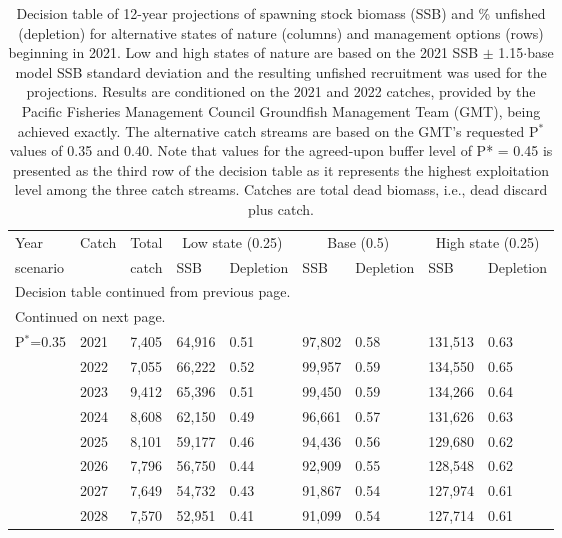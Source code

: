 \documentclass[11pt,
  english,
  a4paper,
]{article}
\begin{document}
\begingroup\fontsize{9}{11}\selectfont
\begingroup\fontsize{9}{11}\selectfont
{}
\begin{longtable}{lll|ll|ll|ll}
\caption{Decision table of 12-year projections of spawning stock biomass (SSB) and \% unfished (depletion) for alternative states of nature (columns) and management options (rows) beginning in 2021. Low and high states of nature are based on the 2021 SSB $\pm$ 1.15$\cdot$base model SSB standard deviation and the resulting unfished recruitment was used for the projections. Results are conditioned on the 2021 and 2022 catches, provided by the Pacific Fisheries Management Council Groundfish Management Team (GMT), being achieved exactly. The alternative catch streams are based on the GMT's requested P$^*$ values of 0.35 and 0.40. Note that values for the agreed-upon buffer level of P* = 0.45 is presented as the third row of the decision table as it represents the highest exploitation level among the three catch streams. Catches are total dead biomass, i.e., dead discard plus catch.} \\ 
  \hline
Year&Catch&Total& \multicolumn{2}{c}{Low state (0.25)} & \multicolumn{2}{c}{Base (0.5)} & \multicolumn{2}{c}{High state (0.25)} \\ 
scenario & &catch& SSB & Depletion & SSB & Depletion & SSB & Depletion \\ 
\hline \endfirsthead
\multicolumn{9}{l}{\footnotesize Decision table continued from previous page.} \\
\hline \endhead
\hline
\multicolumn{9}{l}{\footnotesize Continued on next page.} \\
\endfoot
\endlastfoot
\hline
P$^*$=0.35
& 2021 & 7,405 & 64,916 & 0.51 & 97,802& 0.58 & 131,513 & 0.63 \\ 
&  2022 & 7,055 & 66,222 & 0.52 & 99,957 & 0.59 & 134,550 & 0.65 \\ 
&  2023 & 9,412 & 65,396 & 0.51 & 99,450 & 0.59 & 134,266 & 0.64 \\ 
&  2024 & 8,608 & 62,150 & 0.49 & 96,661 & 0.57 & 131,626 & 0.63 \\ 
&  2025 & 8,101 & 59,177 & 0.46 & 94,436 & 0.56 & 129,680 & 0.62 \\ 
&  2026 & 7,796 & 56,750 & 0.44 & 92,909 & 0.55 & 128,548 & 0.62 \\ 
&  2027 & 7,649 & 54,732 & 0.43 & 91,867 & 0.54 & 127,974 & 0.61 \\ 
&  2028 & 7,570 & 52,951 & 0.41 & 91,099 & 0.54 & 127,714 & 0.61 \\ 

\end{longtable}
\end{document}
